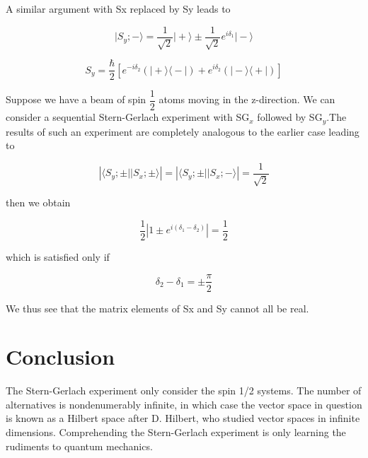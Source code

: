 \documentclass[a4paper]{article}
\newcommand{\ket}[1]{\big|  #1 \big \rangle }
\newcommand{\bra}[1]{ \big\langle #1 \big | }
\begin{document}
A similar argument with Sx replaced by Sy leads to

\begin{equation}
\ket{S_y;-} = \dfrac{1}{\sqrt{2}} \ket{+} \pm \dfrac{1}{\sqrt{2}} e^{i \delta_1} \ket{-}
\end{equation}

\begin{equation}
S_y = \dfrac{\hbar}{2} [e^{-i\delta_2}(\ket{+} \bra{-})+e^{i\delta_2}(\ket{-} \bra{+})]
\end{equation}

Suppose we have a beam of spin $ \dfrac{1}{2} $ atoms moving in the z-direction. We can consider a sequential Stern-Gerlach experiment with SG$ _x $ followed by SG$ _y $.The results of such an experiment are completely analogous to the earlier case leading to

\begin{equation}
| \bra{S_y;\pm} \ket{S_x;\pm} | = | \bra{S_y;\pm} \ket{S_x;-} | = \dfrac{1}{\sqrt{2}}
\end{equation}

then we obtain

\begin{equation}
\dfrac{1}{2} | 1 \pm e^{i (\delta_1-\delta_2)} | = \dfrac{1}{2}
\end{equation}

which is satisfied only if

\begin{equation}
\delta_2 - \delta_1 = \pm \dfrac{\pi}{2}
\end{equation}

We thus see that the matrix elements of Sx and Sy cannot all be real. 


\section{Conclusion}
The Stern-Gerlach experiment only consider the spin 1/2 systems. The number of alternatives is nondenumerably infinite, in which case the vector space in question is known as a Hilbert space after D. Hilbert, who studied vector spaces in infinite dimensions. Comprehending the Stern-Gerlach experiment is only learning the rudiments to quantum mechanics.




\end{document}
